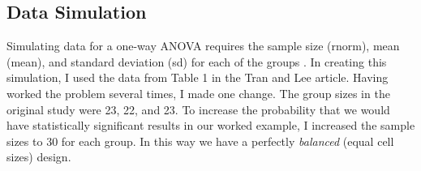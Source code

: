 \documentclass[
  11pt,
]{book}
\begin{document}
\hypertarget{data-simulation}{%
\subsection{Data Simulation}\label{data-simulation}}

Simulating data for a one-way ANOVA requires the sample size (rnorm), mean (mean), and standard deviation (sd) for each of the groups \citep{crump_simulating_2018}. In creating this simulation, I used the data from Table 1 in the Tran and Lee \citeyearpar{tran_you_2014} article. Having worked the problem several times, I made one change. The group sizes in the original study were 23, 22, and 23. To increase the probability that we would have statistically significant results in our worked example, I increased the sample sizes to 30 for each group. In this way we have a perfectly \emph{balanced} (equal cell sizes) design.
\end{document}
